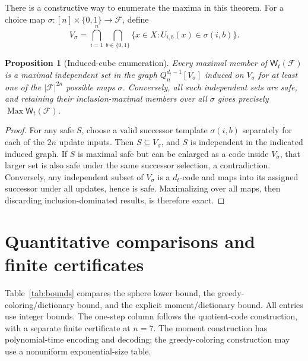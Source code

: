 \documentclass[11pt,a4paper]{article}
\newtheorem{proposition}[theorem]{Proposition}
\begin{document}
There is a constructive way to enumerate the maxima in this theorem. For a choice map $\sigma:[n]\times\{0,1\}\to\mathcal F$, define
\[
V_\sigma=\bigcap_{i=1}^n\bigcap_{b\in\{0,1\}}
\bigl\{x\in X:U_{i,b}(x)\in\sigma(i,b)\bigr\}.
\]
\begin{proposition}[Induced-cube enumeration]\label{prop:induced}
Every maximal member of $\mathsf W_t(\mathcal F)$ is a maximal independent set in the graph $Q_n^{d_t-1}[V_\sigma]$ induced on $V_\sigma$ for at least one of the $|\mathcal F|^{2n}$ possible maps $\sigma$. Conversely, all such independent sets are safe, and retaining their inclusion-maximal members over all $\sigma$ gives precisely $\operatorname{Max}\mathsf W_t(\mathcal F)$.
\end{proposition}
\begin{proof}
For any safe $S$, choose a valid successor template $\sigma(i,b)$ separately for each of the $2n$ update inputs. Then $S\subseteq V_\sigma$, and $S$ is independent in the indicated induced graph. If $S$ is maximal safe but can be enlarged as a code inside $V_\sigma$, that larger set is also safe under the same successor selection, a contradiction. Conversely, any independent subset of $V_\sigma$ is a $d_t$-code and maps into its assigned successor under all updates, hence is safe. Maximalizing over all maps, then discarding inclusion-dominated results, is therefore exact.
\end{proof}


\section{Quantitative comparisons and finite certificates}
Table~\ref{tab:bounds} compares the sphere lower bound, the greedy-coloring/dictionary bound, and the explicit moment/dictionary bound. All entries use integer bounds. The one-step column follows the quotient-code construction, with a separate finite certificate at $n=7$. The moment construction has polynomial-time encoding and decoding; the greedy-coloring construction may use a nonuniform exponential-size table.
\end{document}
